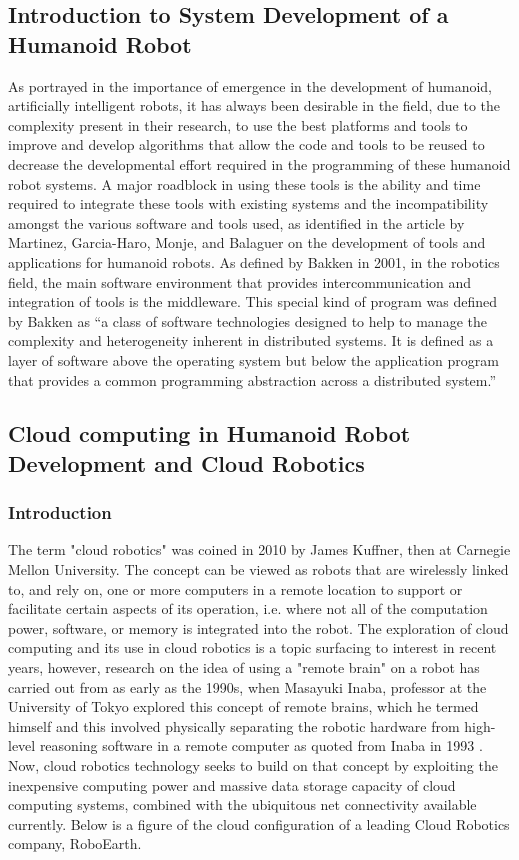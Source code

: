 \documentclass[conference]{IEEEtran}
\begin{document}
\subsection{Introduction to System Development of a Humanoid Robot}
As portrayed in the importance of emergence in the development of humanoid, artificially intelligent robots, it has always been desirable in the field, due to the complexity present in their research, to use the best platforms and tools to improve and develop algorithms that allow the code and tools to be reused to decrease the developmental effort required in the programming of these humanoid robot systems. A major roadblock in using these tools is the ability and time required to integrate these tools with existing systems and the incompatibility amongst the various software and tools used, as identified in the article by Martinez, Garcia-Haro, Monje, and Balaguer on the development of tools and applications for humanoid robots\autocite{1martinezdevelopment}. As defined by Bakken in 2001, in the robotics field, the main software environment that provides intercommunication and integration of tools is the middleware. This special kind of program was defined by Bakken as ``a class of software technologies designed to help to manage the complexity and heterogeneity inherent in distributed systems. It is defined as a layer of software above the operating system but below the application program that provides a common programming abstraction across a distributed system.''\autocite{2bakken2001middleware}

\subsection{Cloud computing in Humanoid Robot Development and Cloud Robotics}
\subsubsection{Introduction}
The term "cloud robotics" was coined in 2010 by James Kuffner, then at Carnegie Mellon University. The concept can be viewed as robots that are wirelessly linked to, and rely on, one or more computers in a remote location to support or facilitate certain aspects of its operation, i.e. where not all of the computation power, software, or memory is integrated into the robot\autocite{3bogue2017cloud}. The exploration of cloud computing and its use in cloud robotics is a topic surfacing to interest in recent years, however, research on the idea of using a "remote brain" on a robot has carried out from as early as the 1990s, when Masayuki Inaba, professor at the University of Tokyo explored this concept of remote brains, which he termed himself and this involved physically separating the robotic hardware from high-level reasoning software in a remote computer as quoted from Inaba in 1993 \autocite{3bogue2017cloud}. Now, cloud robotics technology seeks to build on that concept by exploiting the inexpensive computing power and massive data storage capacity of cloud computing systems, combined with the ubiquitous net connectivity available currently\autocite{3bogue2017cloud}. Below is a figure of the cloud configuration of a leading Cloud Robotics company, RoboEarth\autocite{13wan2016cloud}.
\end{document}

